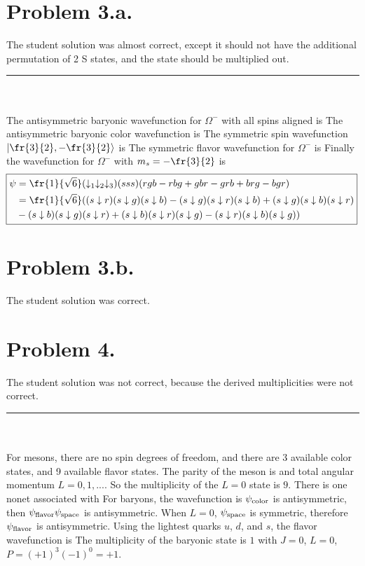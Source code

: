 \documentclass{article}
\begin{document}
\section*{Problem 3.a.}
The student solution was almost correct, except it should not have the additional permutation of 2 S states, and the state should be multiplied out.\\
\hrule
~\\~\\
The antisymmetric baryonic wavefunction for $\Omega^{-}$ with all spins aligned is
The antisymmetric baryonic color wavefunction is
The symmetric spin wavefunction $\ket{\fr{3}{2},-\fr{3}{2}}$ is
The symmetric flavor wavefunction for $\Omega^{-}$ is
Finally the wavefunction for $\Omega^{-}$ with $m_s=-\fr{3}{2}$ is
\[ \! \boxed{\begin{aligned}
\psi&=\fr{1}{\sqrt{6}}(\downarrow_1 \downarrow_2 \downarrow_3)(sss)(rgb-rbg+gbr-grb+brg-bgr)\\
&= \fr{1}{\sqrt{6}}((s\downarrow r)(s\downarrow g)(s\downarrow b)-(s\downarrow g)(s\downarrow r)(s\downarrow b)+(s\downarrow g)(s\downarrow b)(s\downarrow r)\\
&-(s\downarrow b)(s\downarrow g)(s\downarrow r)+(s\downarrow b)(s\downarrow r)(s\downarrow g)-(s\downarrow r)(s\downarrow b)(s\downarrow g))
\end{aligned}} \]
\section*{Problem 3.b.}
The student solution was correct.
\section*{Problem 4.}
The student solution was not correct, because the derived multiplicities were not correct.\\
\hrule
~\\~\\
For mesons, there are no spin degrees of freedom, and there are 3 available color states, and 9 available flavor states. The parity of the meson is
and total angular momentum $L=0,1,...$. So the multiplicity of the $L=0$ state is $\boxed{9}$. There is one nonet associated with
For baryons, the wavefunction is
$\psi_{\textrm{color}}$ is antisymmetric, then $\psi_{\textrm{flavor}}\psi_{\textrm{space}}$ is antisymmetric. When $L=0$, $\psi_{\textrm{space}}$ is symmetric, therefore $\psi_{\textrm{flavor}}$ is antisymmetric. Using the lightest quarks $u$, $d$, and $s$, the flavor wavefunction is
The multiplicity of the baryonic state is $\boxed{1}$ with $J=0$, $L=0$, $P=(+1)^3(-1)^0=+1$.
\end{document}
